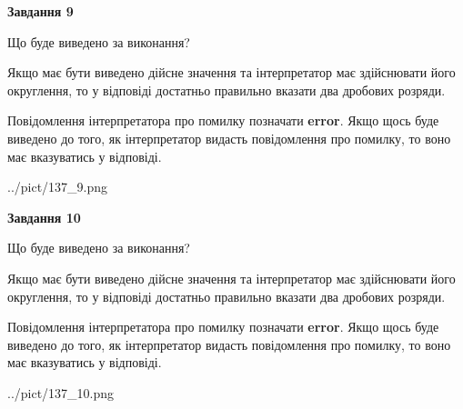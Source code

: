 \documentclass[12pt, ukrainian]{article}
\begin{document}
{\begin {Large}
{\begin {center}\textbf{Завдання 9}\end {center}}\par
Що буде виведено за виконання? \par

Якщо має бути виведено дійсне значення та інтерпретатор має здійснювати його округлення, 
то у відповіді достатньо правильно вказати два дробових розряди.

Повідомлення інтерпретатора про помилку позначати \textbf{error}.
Якщо щось буде виведено до того, як інтерпретатор видасть повідомлення про помилку, 
то воно має вказуватись у відповіді. \par

\begin{center}
	{../pict/137_9.png}
\end{center}
\newpage

{\begin {center}\textbf{Завдання 10}\end {center}}\par
Що буде виведено за виконання? \par

Якщо має бути виведено дійсне значення та інтерпретатор має здійснювати його округлення, 
то у відповіді достатньо правильно вказати два дробових розряди.

Повідомлення інтерпретатора про помилку позначати \textbf{error}.
Якщо щось буде виведено до того, як інтерпретатор видасть повідомлення про помилку, 
то воно має вказуватись у відповіді. \par

\begin{center}
	{../pict/137_10.png}
\end{center}
\newpage

\end {Large}}
\end{document}
